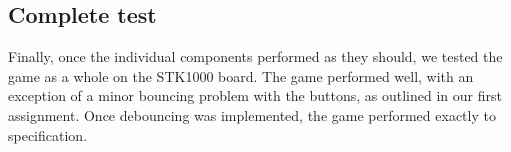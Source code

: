 \subsection{Complete test}
Finally, once the individual components performed as they should, we tested the game as a whole on the STK1000 board. The game performed well, with an exception of a minor bouncing problem with the buttons, as outlined in our first assignment. Once debouncing was implemented, the game performed exactly to specification.
